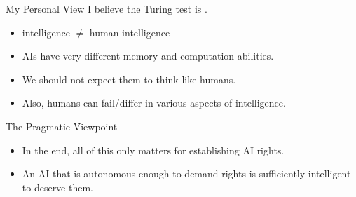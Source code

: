 \documentclass[xcolor={usenames,svgnames,x11names,dvipsnames,table}]{beamer}
\begin{document}
\begin{frame}{My Personal View}
    I believe the Turing test is .
    \begin{itemize}
        \item intelligence $\neq$ human intelligence
        \item AIs have very different memory and computation abilities.
        \item We should not expect them to think like humans.
        \item Also, humans can fail\slash differ in various aspects of intelligence.\\
    \end{itemize}

    \pause
    \begin{block}{The Pragmatic Viewpoint}
        \begin{itemize}
            \item In the end, all of this only matters for establishing AI rights.
            \item An AI that is autonomous enough to demand rights is sufficiently intelligent to deserve them.
        \end{itemize}
    \end{block}
\end{frame}
\end{document}
